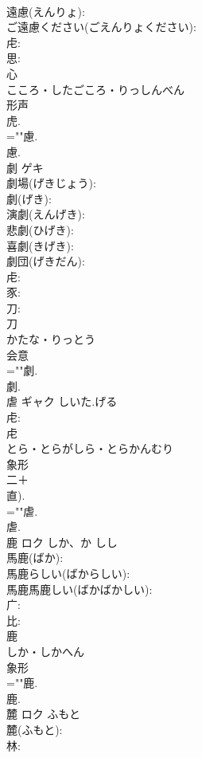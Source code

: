 \documentclass[8pt]{extreport}
\begin{document}
\begin{CJK}{UTF8}{min}
\\	遠慮(えんりょ): 
\\	ご遠慮ください(ごえんりょください): 
\\	虍: 
\\	思: 
\\	心	
\\	こころ・したごころ・りっしんべん	
\\	形声 
\\	虎.
\\	=""慮.
\\	慮.
\\	劇	ゲキ			
\\	劇場(げきじょう): 
\\	劇(げき): 
\\	演劇(えんげき): 
\\	悲劇(ひげき): 
\\	喜劇(きげき): 
\\	劇団(げきだん): 
\\	虍: 
\\	豕: 
\\	刀: 
\\	刀	
\\	かたな・りっとう	
\\	会意 
\\	=""劇.
\\	劇.
\\	虐	ギャク	しいた.げる		
\\	虍: 
\\	虍	
\\	とら・とらがしら・とらかんむり	
\\	象形 
\\	二＋
\\	直).
\\	=""虐.
\\	虐.
\\	鹿	ロク	しか、か	しし	
\\	馬鹿(ばか): 
\\	馬鹿らしい(ばからしい): 
\\	馬鹿馬鹿しい(ばかばかしい): 
\\	广: 
\\	比: 
\\	鹿	
\\	しか・しかへん	
\\	象形 
\\	=""鹿.
\\	鹿.
\\	麓	ロク	ふもと		
\\	麓(ふもと): 
\\	林: 

\end{CJK}
\end{document}
